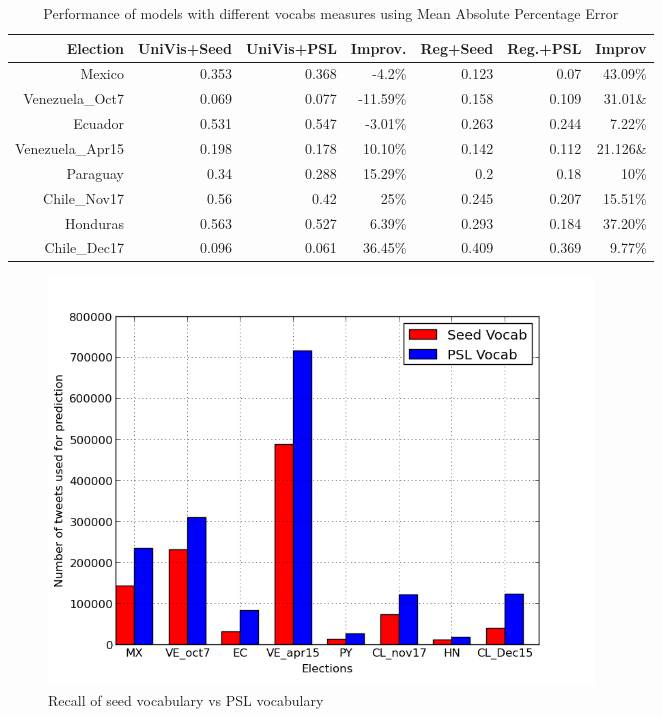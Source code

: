\begin{table}[Ht]
	\centering
	\begin{tabular}{| r || r | r | r | r | r | r |}
 	\hline
 	Election & UniVis+Seed & UniVis+PSL & Improv. & Reg+Seed & Reg.+PSL & Improv\\
 	\hline
	Mexico & 0.353 & 0.368 & -4.2\% & 0.123 & 0.07 & 43.09\% \\ 	
 	Venezuela\_Oct7 & 0.069	& 0.077 & -11.59\% & 0.158 & 0.109 & 31.01\&\\
	Ecuador & 0.531 & 0.547 & -3.01\% & 0.263 & 0.244 & 7.22\% \\
	Venezuela\_Apr15 & 0.198 & 0.178 & 10.10\% & 0.142 & 0.112 & 21.126\&\\
	Paraguay & 0.34 & 0.288 & 15.29\% & 0.2 & 0.18 & 10\% \\
	Chile\_Nov17 & 0.56 & 0.42 & 25\% & 0.245 & 0.207 & 15.51\% \\
	Honduras & 0.563 & 0.527 & 6.39\% & 0.293 & 0.184 & 37.20\% \\
	Chile\_Dec17 & 0.096 & 0.061 & 36.45\% & 0.409 & 0.369 & 9.77\% \\
 	\hline
	\end{tabular}
	\vspace{-0.5em}
	\caption{Performance of models with different vocabs measures using Mean Absolute Percentage Error}
	\label{table:improvement}
	\vspace{-0.5em}
\end{table}	
\begin{figure}[Ht]
	\centering
	\includegraphics[width=0.7\textwidth, height=0.3\textheight]{support_files/Recall.png}
\vspace{-1em}
	\caption{Recall of seed vocabulary vs PSL vocabulary}
	\label{fig:recall}
	\vspace{-1em}
\end{figure}
